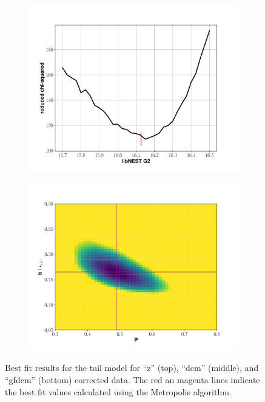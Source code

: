 {\begin{figure}[h!]
\begin{subfigure}{0.5\textwidth}
  \includegraphics[width=\textwidth]{Figures/S2tail_g2fit_gfdcm.pdf}
\end{subfigure}%
\begin{subfigure}{0.5\textwidth}
  \centering
  \includegraphics[width=\textwidth]{Figures/S2tail_heatmap_gfdcm.pdf}
\end{subfigure}
\caption{Best fit results for the tail model for ``z'' (top), ``dcm'' (middle), and ``gfdcm'' (bottom) corrected data. The red an magenta lines indicate the best fit values calculated using the Metropolis algorithm.}
\label{fig:s2bestfit}
\end{figure}

}
